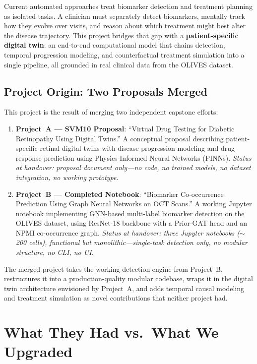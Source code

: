 \documentclass[12pt,a4paper]{article}
\begin{document}
Current automated approaches treat biomarker detection and treatment planning as isolated tasks. A clinician must separately detect biomarkers, mentally track how they evolve over visits, and reason about which treatment might best alter the disease trajectory. This project bridges that gap with a \textbf{patient-specific digital twin}: an end-to-end computational model that chains detection, temporal progression modeling, and counterfactual treatment simulation into a single pipeline, all grounded in real clinical data from the OLIVES dataset.

\subsection{Project Origin: Two Proposals Merged}

This project is the result of merging two independent capstone efforts:

\begin{enumerate}[leftmargin=*]
  \item \textbf{Project~A --- SVM10 Proposal}: ``Virtual Drug Testing for Diabetic Retinopathy Using Digital Twins.'' A conceptual proposal describing patient-specific retinal digital twins with disease progression modeling and drug response prediction using Physics-Informed Neural Networks (PINNs). \emph{Status at handover: proposal document only---no code, no trained models, no dataset integration, no working prototype.}

  \item \textbf{Project~B --- Completed Notebook}: ``Biomarker Co-occurrence Prediction Using Graph Neural Networks on OCT Scans.'' A working Jupyter notebook implementing GNN-based multi-label biomarker detection on the OLIVES dataset, using ResNet-18 backbone with a Prior-GAT head and an NPMI co-occurrence graph. \emph{Status at handover: three Jupyter notebooks ($\sim$200 cells), functional but monolithic---single-task detection only, no modular structure, no CLI, no UI.}
\end{enumerate}

The merged project takes the working detection engine from Project~B, restructures it into a production-quality modular codebase, wraps it in the digital twin architecture envisioned by Project~A, and adds temporal causal modeling and treatment simulation as novel contributions that neither project had.

\section{What They Had vs.\ What We Upgraded}
\label{sec:comparison}
\end{document}
